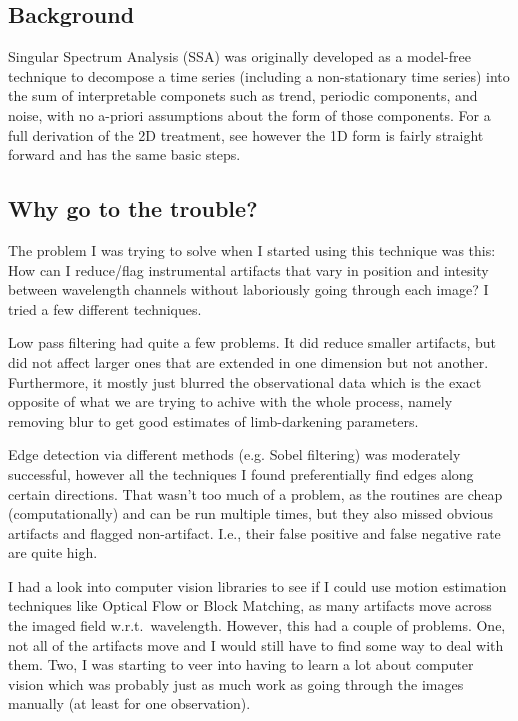 \subsection{Background}
	Singular Spectrum Analysis (SSA) \cite{Ghil02} was originally developed as a model-free technique to decompose a time series (including a non-stationary time series) into the sum of interpretable componets such as trend, periodic components, and noise, with no a-priori assumptions about the form of those components. For a full derivation of the 2D treatment, see \cite{Golyandina13} however the 1D form is fairly straight forward and has the same basic steps.

\subsection{Why go to the trouble?}
The problem I was trying to solve when I started using this technique was this: How can I reduce/flag instrumental artifacts that vary in position and intesity between wavelength channels without laboriously going through each image? I tried a few different techniques.

Low pass filtering had quite a few problems. It did reduce smaller artifacts, but did not affect larger ones that are extended in one dimension but not another. Furthermore, it mostly just blurred the observational data which is the exact opposite of what we are trying to achive with the whole process, namely removing blur to get good estimates of limb-darkening parameters.

Edge detection via different methods (e.g. Sobel filtering) was moderately successful, however all the techniques I found preferentially find edges along certain directions. That wasn't too much of a problem, as the routines are cheap (computationally) and can be run multiple times, but they also missed obvious artifacts and flagged non-artifact. I.e., their false positive and false negative rate are quite high.

I had a look into computer vision libraries to see if I could use motion estimation techniques like Optical Flow or Block Matching, as many artifacts move across the imaged field w.r.t.~wavelength. However, this had a couple of problems. One, not all of the artifacts move and I would still have to find some way to deal with them. Two, I was starting to veer into having to learn a lot about computer vision which was probably just as much work as going through the images manually (at least for one observation).

